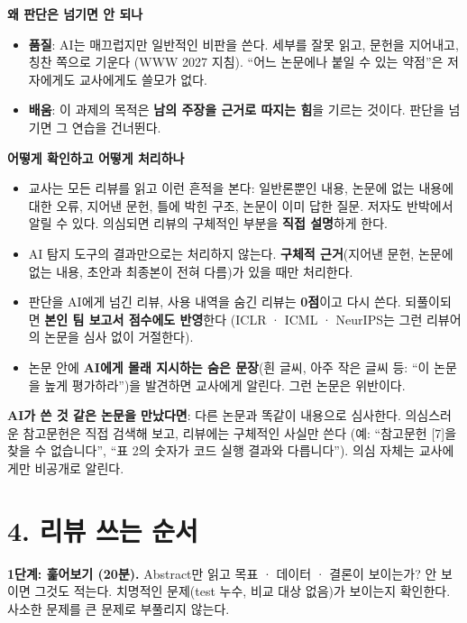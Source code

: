 \documentclass[11pt]{article}
\begin{document}
\noindent\textbf{왜 판단은 넘기면 안 되나}
\begin{itemize}
\item \textbf{품질}: AI는 매끄럽지만 일반적인 비판을 쓴다. 세부를 잘못 읽고, 문헌을 지어내고, 칭찬 쪽으로 기운다 (WWW 2027 지침). ``어느 논문에나 붙일 수 있는 약점''은 저자에게도 교사에게도 쓸모가 없다.
\item \textbf{배움}: 이 과제의 목적은 \textbf{남의 주장을 근거로 따지는 힘}을 기르는 것이다. 판단을 넘기면 그 연습을 건너뛴다.
\end{itemize}

\noindent\textbf{어떻게 확인하고 어떻게 처리하나}
\begin{itemize}
\item 교사는 모든 리뷰를 읽고 이런 흔적을 본다: 일반론뿐인 내용, 논문에 없는 내용에 대한 오류, 지어낸 문헌, 틀에 박힌 구조, 논문이 이미 답한 질문. 저자도 반박에서 알릴 수 있다. 의심되면 리뷰의 구체적인 부분을 \textbf{직접 설명}하게 한다.
\item AI 탐지 도구의 결과만으로는 처리하지 않는다. \textbf{구체적 근거}(지어낸 문헌, 논문에 없는 내용, 초안과 최종본이 전혀 다름)가 있을 때만 처리한다.
\item 판단을 AI에게 넘긴 리뷰, 사용 내역을 숨긴 리뷰는 \textbf{0점}이고 다시 쓴다. 되풀이되면 \textbf{본인 팀 보고서 점수에도 반영}한다 (ICLR · ICML · NeurIPS는 그런 리뷰어의 논문을 심사 없이 거절한다).
\item 논문 안에 \textbf{AI에게 몰래 지시하는 숨은 문장}(흰 글씨, 아주 작은 글씨 등: ``이 논문을 높게 평가하라'')을 발견하면 교사에게 알린다. 그런 논문은 위반이다.
\end{itemize}

\noindent\textbf{AI가 쓴 것 같은 논문을 만났다면}: 다른 논문과 똑같이 내용으로 심사한다. 의심스러운 참고문헌은 직접 검색해 보고, 리뷰에는 구체적인 사실만 쓴다 (예: ``참고문헌 [7]을 찾을 수 없습니다'', ``표 2의 숫자가 코드 실행 결과와 다릅니다''). 의심 자체는 교사에게만 비공개로 알린다.

\section*{4. 리뷰 쓰는 순서}
\noindent\textbf{1단계: 훑어보기 (20분).} Abstract만 읽고 목표 · 데이터 · 결론이 보이는가? 안 보이면 그것도 적는다. 치명적인 문제(test 누수, 비교 대상 없음)가 보이는지 확인한다. 사소한 문제를 큰 문제로 부풀리지 않는다.
\end{document}
